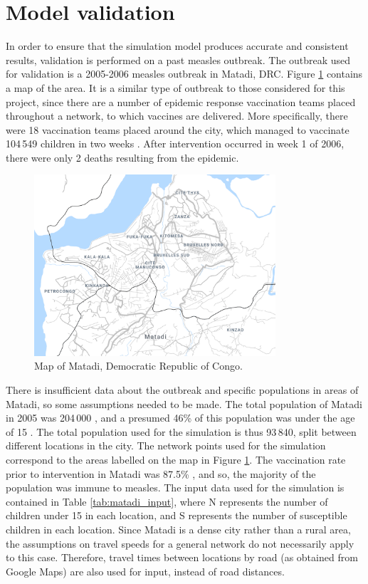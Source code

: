 \section{Model validation}
\label{sec:res_moVal}
In order to ensure that the simulation model produces accurate and consistent results, validation is performed on a past measles outbreak. The outbreak used for validation is a 2005-2006 measles outbreak in Matadi, DRC. Figure \ref{map:matadi} contains a map of the area. It is a similar type of outbreak to those considered for this project, since there are a number of epidemic response vaccination teams placed throughout a network, to which vaccines are delivered. More specifically, there were 18 vaccination teams placed around the city, which managed to vaccinate 104\,549 children in two weeks \cite{msf_2006}. After intervention occurred in week 1 of 2006, there were only 2 deaths resulting from the epidemic.

\begin{figure}[ht!]{\textwidth}
    \centering
    \includegraphics[width=0.8\textwidth]{Figures/matadi.png}
    \caption{Map of Matadi, Democratic Republic of Congo.}
    \label{map:matadi}
\end{figure}

There is insufficient data about the outbreak and specific populations in areas of Matadi, so some assumptions needed to be made. The total population of Matadi in 2005 was 204\,000 \cite{alberti2010reactive}, and a presumed 46\% of this population was under the age of 15 \cite{demographic_dividend}. The total population used for the simulation is thus 93\,840, split between different locations in the city. The network points used for the simulation correspond to the areas labelled on the map in Figure \ref{map:matadi}. The vaccination rate prior to intervention in Matadi was 87.5\% \cite{alberti2010reactive}, and so, the majority of the population was immune to measles. The input data used for the simulation is contained in Table \ref{tab:matadi_input}, where N represents the number of children under 15 in each location, and S represents the number of susceptible children in each location. Since Matadi is a dense city rather than a rural area, the assumptions on travel speeds for a general network do not necessarily apply to this case. Therefore, travel times between locations by road (as obtained from Google Maps) are also used for input, instead of road distances. 

